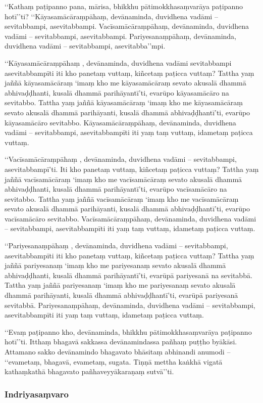 ‘‘Kathaṃ paṭipanno pana, mārisa, bhikkhu pātimokkhasaṃvarāya paṭipanno hotī’’ti? ‘‘Kāyasamācāraṃpāhaṃ, devānaminda, duvidhena vadāmi – sevitabbampi, asevitabbampi. Vacīsamācāraṃpāhaṃ, devānaminda, duvidhena vadāmi – sevitabbampi, asevitabbampi. Pariyesanaṃpāhaṃ, devānaminda, duvidhena vadāmi – sevitabbampi, asevitabba’’mpi.

‘‘Kāyasamācāraṃpāhaṃ , devānaminda, duvidhena vadāmi sevitabbampi asevitabbampīti iti kho panetaṃ vuttaṃ, kiñcetaṃ paṭicca vuttaṃ? Tattha yaṃ jaññā kāyasamācāraṃ ‘imaṃ kho me kāyasamācāraṃ sevato akusalā dhammā abhivaḍḍhanti, kusalā dhammā parihāyantī’ti, evarūpo kāyasamācāro na sevitabbo. Tattha yaṃ jaññā kāyasamācāraṃ ‘imaṃ kho me kāyasamācāraṃ sevato akusalā dhammā parihāyanti, kusalā dhammā abhivaḍḍhantī’ti, evarūpo kāyasamācāro sevitabbo. Kāyasamācāraṃpāhaṃ, devānaminda, duvidhena vadāmi – sevitabbampi, asevitabbampīti iti yaṃ taṃ vuttaṃ, idametaṃ paṭicca vuttaṃ.

‘‘Vacīsamācāraṃpāhaṃ , devānaminda, duvidhena vadāmi – sevitabbampi, asevitabbampī’ti. Iti kho panetaṃ vuttaṃ, kiñcetaṃ paṭicca vuttaṃ? Tattha yaṃ jaññā vacīsamācāraṃ ‘imaṃ kho me vacīsamācāraṃ sevato akusalā dhammā abhivaḍḍhanti, kusalā dhammā parihāyantī’ti, evarūpo vacīsamācāro na sevitabbo. Tattha yaṃ jaññā vacīsamācāraṃ ‘imaṃ kho me vacīsamācāraṃ sevato akusalā dhammā parihāyanti, kusalā dhammā abhivaḍḍhantī’ti, evarūpo vacīsamācāro sevitabbo. Vacīsamācāraṃpāhaṃ, devānaminda, duvidhena vadāmi – sevitabbampi, asevitabbampīti iti yaṃ taṃ vuttaṃ, idametaṃ paṭicca vuttaṃ.

‘‘Pariyesanaṃpāhaṃ , devānaminda, duvidhena vadāmi – sevitabbampi, asevitabbampīti iti kho panetaṃ vuttaṃ, kiñcetaṃ paṭicca vuttaṃ? Tattha yaṃ jaññā pariyesanaṃ ‘imaṃ kho me pariyesanaṃ sevato akusalā dhammā abhivaḍḍhanti, kusalā dhammā parihāyantī’ti, evarūpā pariyesanā na sevitabbā. Tattha yaṃ jaññā pariyesanaṃ ‘imaṃ kho me pariyesanaṃ sevato akusalā dhammā parihāyanti, kusalā dhammā abhivaḍḍhantī’ti, evarūpā pariyesanā sevitabbā. Pariyesanaṃpāhaṃ, devānaminda, duvidhena vadāmi – sevitabbampi, asevitabbampīti iti yaṃ taṃ vuttaṃ, idametaṃ paṭicca vuttaṃ.

‘‘Evaṃ paṭipanno kho, devānaminda, bhikkhu pātimokkhasaṃvarāya paṭipanno hotī’’ti. Itthaṃ bhagavā sakkassa devānamindassa pañhaṃ puṭṭho byākāsi. Attamano sakko devānamindo bhagavato bhāsitaṃ abhinandi anumodi – ‘‘evametaṃ, bhagavā, evametaṃ, sugata. Tiṇṇā mettha kaṅkhā vigatā kathaṃkathā bhagavato pañhaveyyākaraṇaṃ sutvā’’ti.

\subsubsection{Indriyasaṃvaro}


